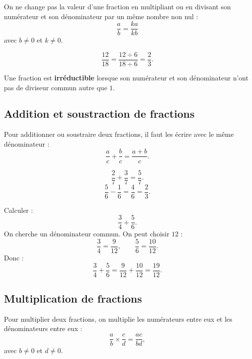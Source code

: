 \documentclass[11pt,a4paper]{article}
\begin{document}
\begin{propriete}
On ne change pas la valeur d'une fraction en multipliant ou en divisant son numérateur et son dénominateur par un même nombre non nul :
\[
\frac{a}{b}=\frac{ka}{kb}
\]
avec $b\neq0$ et $k\neq0$.
\end{propriete}

\begin{exemple}
\[
\frac{12}{18}=\frac{12\div 6}{18\div 6}=\frac{2}{3}.
\]
\end{exemple}

\begin{definitionbox}
Une fraction est \textbf{irréductible} lorsque son numérateur et son dénominateur n'ont pas de diviseur commun autre que $1$.
\end{definitionbox}

\subsection{Addition et soustraction de fractions}

\begin{propriete}
Pour additionner ou soustraire deux fractions, il faut les écrire avec le même dénominateur :
\[
\frac{a}{c}+\frac{b}{c}=\frac{a+b}{c}.
\]
\end{propriete}

\begin{exemple}
\[
\frac{2}{7}+\frac{3}{7}=\frac{5}{7}.
\]
\[
\frac{5}{6}-\frac{1}{6}=\frac{4}{6}=\frac{2}{3}.
\]
\end{exemple}

\begin{exemple}
Calculer :
\[
\frac{3}{4}+\frac{5}{6}.
\]
On cherche un dénominateur commun. On peut choisir $12$ :
\[
\frac{3}{4}=\frac{9}{12},
\qquad
\frac{5}{6}=\frac{10}{12}.
\]
Donc :
\[
\frac{3}{4}+\frac{5}{6}=\frac{9}{12}+\frac{10}{12}=\frac{19}{12}.
\]
\end{exemple}

\subsection{Multiplication de fractions}

\begin{propriete}
Pour multiplier deux fractions, on multiplie les numérateurs entre eux et les dénominateurs entre eux :
\[
\frac{a}{b}\times\frac{c}{d}=\frac{ac}{bd},
\]
avec $b\neq0$ et $d\neq0$.
\end{propriete}
\end{document}
